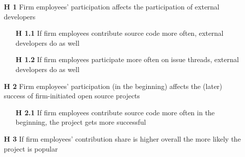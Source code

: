 \begin{itemize}
    \item [\textbf{H 1}] Firm employees' participation affects the participation of external developers
		\begin{itemize}
			\item [\textbf{H 1.1}] If firm employees contribute source code more often, external developers do as well
			\item [\textbf{H 1.2}] If firm employees participate more often on issue threads, external developers do as well
		\end{itemize}
    \item [\textbf{H 2}] Firm employees' participation (in the beginning) affects the (later) success of firm-initiated open source projects
		\begin{itemize}
			\item [\textbf{H 2.1}] If firm employees contribute source code more often in the beginning, the project gets more successful
		\end{itemize}
		\item [\textbf{H 3}] If firm employees' contribution share is higher overall the more likely the project is popular
\end{itemize}

